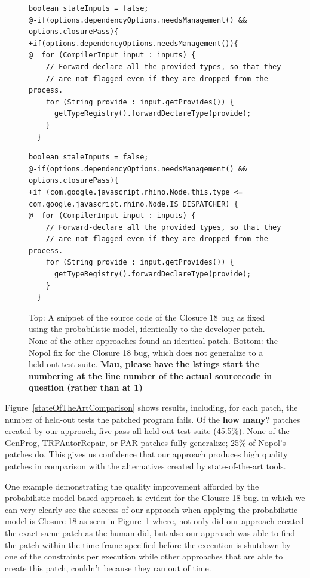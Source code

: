\documentclass[conference]{IEEEtran}
\newcommand{\todo}[1]
  {{\scriptsize \textbf{\color{red} {#1}}}}
\begin{document}
\begin{figure}[t]
\begin{lstlisting}[frame=single]
boolean staleInputs = false;
@-if(options.dependencyOptions.needsManagement() && options.closurePass){
+if(options.dependencyOptions.needsManagement()){
@  for (CompilerInput input : inputs) {
    // Forward-declare all the provided types, so that they
    // are not flagged even if they are dropped from the process.
    for (String provide : input.getProvides()) {
      getTypeRegistry().forwardDeclareType(provide);
    }  
  }
	\end{lstlisting}


\begin{lstlisting}[frame=single]
boolean staleInputs = false;
@-if(options.dependencyOptions.needsManagement() && options.closurePass){
+if (com.google.javascript.rhino.Node.this.type <= com.google.javascript.rhino.Node.IS_DISPATCHER) {
@  for (CompilerInput input : inputs) {
    // Forward-declare all the provided types, so that they
    // are not flagged even if they are dropped from the process.
    for (String provide : input.getProvides()) {
      getTypeRegistry().forwardDeclareType(provide);
    }  
  }
	\end{lstlisting}

	\caption{Top: A snippet of the source code of the Closure 18 bug as fixed using the
      probabilistic model, identically to the developer patch. None of the other
      approaches found an identical patch.  Bottom: the Nopol fix for the
      Closure 18 bug, which does not generalize to a held-out test
      suite.\label{closure18prob}\todo{Mau, please have the lstings start the
        numbering at the line number of the actual sourcecode in question
        (rather than at 1)}}
\end{figure}


Figure~\ref{stateOfTheArtComparison} shows results, including, for each patch,
the number of held-out tests the patched program fails. Of the \todo{how many?}
patches created by our approach, 
five pass all held-out test suite (45.5\%). None of the GenProg,
TRPAutorRepair, or PAR patches fully generalize; 25\% of Nopol's patches do.
This gives us confidence that our approach produces high
quality patches in comparison with the alternatives created by state-of-the-art
tools. 

One example demonstrating the quality improvement afforded by the probabilistic
model-based approach is evident for the Clousre 18 bug.  in which we can very clearly see the success of our approach when
applying the probabilistic model is Closure 18 as seen in
Figure~\ref{closure18prob} where, not only did our approach created the exact
same patch as the human did, but also our approach was able to find the patch
within the time frame specified before the execution is shutdown by one of the
constraints per execution while other approaches that are able to create this
patch, couldn't because they ran out of time.
\end{document}
